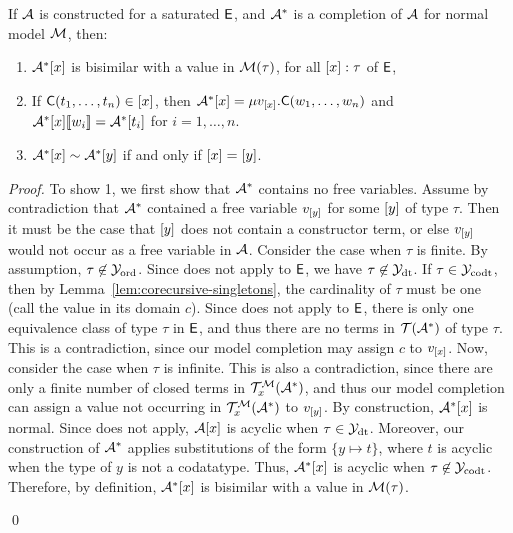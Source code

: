 \begin{lemma} 
\label{lem:model-completion}
If $\mathcal{A}$ is constructed for a saturated $\mathsf{E}$,
and $\mathcal{A}^\ast$ is a completion of $\mathcal{A}$ for normal model $\mathcal{M}$, then:
\begin{enumerate}
\item $\mathcal{A}^\ast [ x ]$ is bisimilar with a value in $\mathcal{M}( \tau )$, for all $[ x ] : \tau$ of $\mathsf{E}$,
\item
If $\textsf{C}( t_1, \ldots, t_n ) \in [ x ]$,
then $\mathcal{A}^\ast [ x ] = \mu v_{[ x ]}. \textsf{C}( w_1, \ldots, w_n )$
and $\mathcal{A}^\ast [ x ] [\![  w_i  ]\!] = \mathcal{A}^\ast [ t_i ]$ for $i = 1, \ldots, n$.
\item 
$\mathcal{A}^\ast [ x ] \sim \mathcal{A}^\ast [ y ]$ if and only if $[ x ] = [ y ]$.
\end{enumerate}
\end{lemma}
\begin{proof}
To show 1, we first show that $\mathcal{A}^\ast$ contains no free variables.
Assume by contradiction that $\mathcal{A}^\ast$ contained a free variable $v_{[ y ]}$ for some $[ y ]$ of type $\tau$.
Then it must be the case that $[ y ]$ does not contain a constructor term,
or else $v_{[ y ]}$ would not occur as a free variable in $\mathcal{A}$.
Consider the case when $\tau$ is finite.
By assumption, $\tau \not\in \mathcal{Y}_{\mathrm{ord}}$.
Since  does not apply to $\mathsf{E}$, we have $\tau \not\in \mathcal{Y}_{\mathrm{dt}}$.
If $\tau \in \mathcal{Y}_{\mathrm{codt}}$, then by Lemma~\ref{lem:corecursive-singletons},
the cardinality of $\tau$ must be one (call the value in its domain $c$).
Since  does not apply to $\mathsf{E}$,
there is only one equivalence class of type $\tau$ in $\mathsf{E}$,
and thus there are no terms in $\mathcal{T}(\mathcal{A}^\ast)$ of type $\tau$.
This is a contradiction, since our model completion may assign $c$ to $v_{[ x ]}$.
Now, consider the case when $\tau$ is infinite.
This is also a contradiction, 
since there are only a finite number of closed terms in $\mathcal{T}^{\mathcal{M}}_x(\mathcal{A}^\ast)$,
and thus our model completion can assign a value not occurring in $\mathcal{T}^{\mathcal{M}}_x(\mathcal{A}^\ast)$ to $v_{[ y ]}$.
By construction, $\mathcal{A}^\ast [ x ]$ is normal.
Since  does not apply, $\mathcal{A} [ x ]$ is acyclic when $\tau \in \mathcal{Y}_{\mathrm{dt}}$.
Moreover, our construction of $\mathcal{A}^\ast$ applies substitutions of the form 
$\{ y \mapsto t \}$, where $t$ is acyclic when the type of $y$ is not a codatatype.
Thus, $\mathcal{A}^\ast [ x ]$ is acyclic when $\tau \not\in \mathcal{Y}_{\mathrm{codt}}$.
Therefore, by definition, $\mathcal{A}^\ast [ x ]$ is bisimilar with a value in $\mathcal{M}( \tau )$.


\qed
\end{proof}

